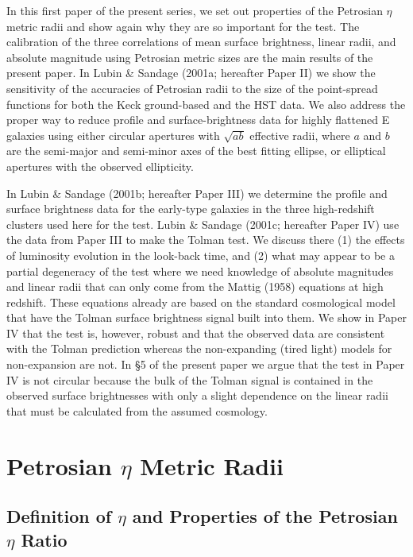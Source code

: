 \documentclass[preprint]{aastex}
\begin{document}
In this first paper of the present series, we set out properties of
the Petrosian $\eta$ metric radii and show again why they are so
important for the test. The calibration of the three correlations of
mean surface brightness, linear radii, and absolute magnitude using
Petrosian metric sizes are the main results of the present paper.  In
Lubin \& Sandage (2001a; hereafter Paper II) we show the sensitivity
of the accuracies of Petrosian radii to the size of the point-spread
functions for both the Keck ground-based and the HST data. We also
address the proper way to reduce profile and surface-brightness data
for highly flattened E galaxies using either circular apertures with
$\sqrt{ab}$ effective radii, where $a$ and $b$ are the semi-major and
semi-minor axes of the best fitting ellipse, or elliptical apertures
with the observed ellipticity.

In Lubin \& Sandage (2001b; hereafter Paper III) we determine the
profile and surface brightness data for the early-type galaxies in the
three high-redshift clusters used here for the test.  Lubin \& Sandage
(2001c; hereafter Paper IV) use the data from Paper III to make the
Tolman test. We discuss there (1) the effects of luminosity evolution
in the look-back time, and (2) what may appear to be a partial
degeneracy of the test where we need knowledge of absolute magnitudes
and linear radii that can only come from the Mattig (1958) equations
at high redshift. These equations already are based on the standard
cosmological model that have the Tolman surface brightness signal
built into them. We show in Paper IV that the test is, however, robust
and that the observed data are consistent with the Tolman prediction
whereas the non-expanding (tired light) models for non-expansion are
not. In \S 5 of the present paper we argue that the test in Paper IV
is not circular because the bulk of the Tolman signal is contained in
the observed surface brightnesses with only a slight dependence on the
linear radii that must be calculated from the assumed cosmology.
 
\section{Petrosian $\eta$ Metric Radii}

\subsection{Definition of $\eta$ and Properties of the Petrosian $\eta$ Ratio}
\end{document}
